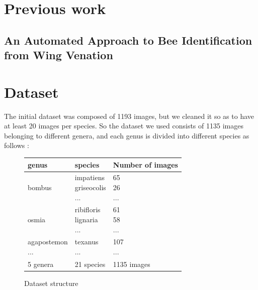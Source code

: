 \documentclass[a4paper]{article}
\begin{document}
\section{Previous work}
\label{sec:theory}

\subsection{An Automated Approach to Bee Identification from Wing Venation}

\newpage
\section{Dataset}
The initial dataset was composed of 1193 images, but we cleaned it so as to have at least 20 images per species.
So the dataset we used consists of 1135 images belonging to different genera, and each genus is divided into different species as follows :

\begin{figure}[h]
    \begin{tabular}{ |m{2cm}|m{10em}|m{10em}| }
 \hline
genus & species & Number of images \\
\hline
bombus& \makecell{impatiens \\ griseocolis \\ ...}& \makecell{65  \\ 26 \\...}\\
\hline
osmia & \makecell{ribifloris \\ lignaria \\ ...}  & \makecell{61\\ 58\\ ...}\\
\hline
\makecell{agapostemon \\ ... }& \makecell{texanus \\ ...}& \makecell{107  \\... }\\
\hline
5 genera & 21 species & 1135 images\\
\hline
\end{tabular}
\caption{Dataset structure}
\end{figure}
\end{document}
